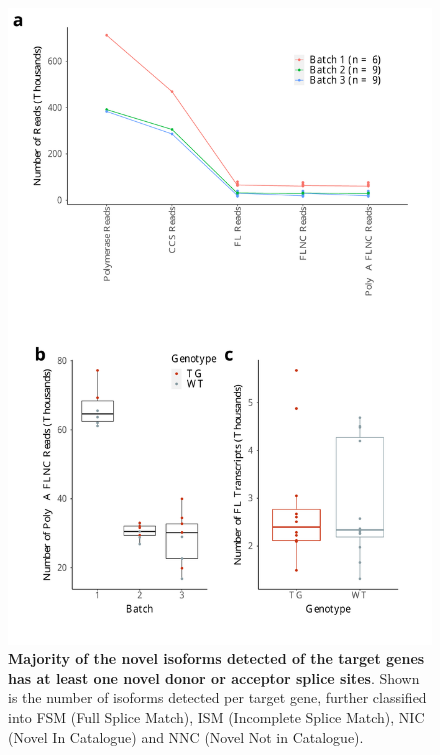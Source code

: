 \begin{figure}[!htp]
	\begin{center}
		\includegraphics[page=6,scale = 0.55]{Figures/TargetedTranscriptome.pdf}
	\end{center}
	\captionsetup{width=0.95\textwidth}
	\caption[Classification of novel and known isoforms from Targeted Sequencing in mouse cortex]%
	{\textbf{Majority of the novel isoforms detected of the target genes has at least one novel donor or acceptor splice sites}. Shown is the number of isoforms detected per target gene, further classified into FSM (Full Splice Match), ISM (Incomplete Splice Match), NIC (Novel In Catalogue) and NNC (Novel Not in Catalogue).}
\end{figure}



